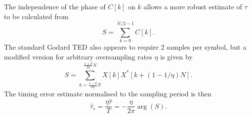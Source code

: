 \documentclass[12pt,a4paper]{article}
\begin{document}
The independence of the phase of $C[k]$ on $k$ allows a more robust estimate of $\tau$ to be calculated from
\begin{equation}
    S = \sum_{k=0}^{N/2-1}C[k].
\end{equation}
The standard Godard TED also appears to require 2 samples per symbol, but a modified version for arbitrary oversampling rates $\eta$ is given by \cite{Josten;17}
\begin{equation}
    S = \sum_{k=\frac{1-\beta}{2\eta}N}^{\frac{1+\beta}{2\eta}N} X[k]X^*[k+(1 - 1/\eta)N].
\end{equation}
The timing error estimate normalised to the sampling period is then
\begin{equation}
    \hat{\tau}_s = \frac{\eta\hat{\tau}}{T} = -\frac{\eta}{2\pi}\arg(S).
    \label{eq:godard_est}
\end{equation}
\end{document}
